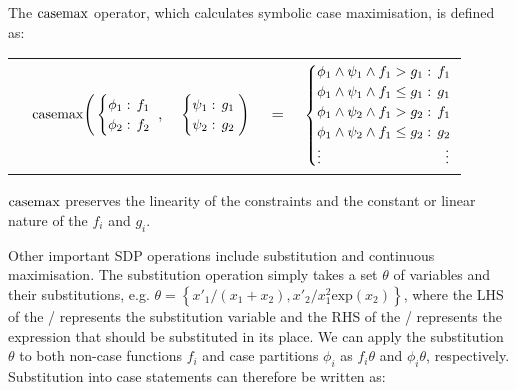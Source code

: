 The $\mathrm{casemax}$ operator, which calculates symbolic case maximisation,
is defined as:
{\small 
\abovedisplayskip=0pt
\belowdisplayskip=0pt
\begin{center}
  \begin{tabular}{r c c c l}
  &
  \hspace{-7mm} $\mathrm{casemax} \Bigg(
    \begin{cases}
        \phi_1: \hspace{-1mm} & \hspace{-1mm} f_1 \\ 
        \phi_2: \hspace{-1mm} & \hspace{-1mm} f_2 \\ 
    \end{cases}$
  $,$
  &
  \hspace{-4mm}
    $\begin{cases}
        \psi_1: \hspace{-1mm} & \hspace{-1mm} g_1 \\ 
        \psi_2: \hspace{-1mm} & \hspace{-1mm} g_2 \\ 
    \end{cases} \Bigg)$
  &
  \hspace{-4mm} 
  $ = $
  &
  \hspace{-4mm}
    $\begin{cases}
      \phi_1 \wedge \psi_1 \wedge f_1 > g_1    : & \hspace{-2mm} f_1 \\ 
      \phi_1 \wedge \psi_1 \wedge f_1 \leq g_1 : & \hspace{-2mm} g_1 \\ 
      \phi_1 \wedge \psi_2 \wedge f_1 > g_2    : & \hspace{-2mm} f_1 \\ 
      \phi_1 \wedge \psi_2 \wedge f_1 \leq g_2 : & \hspace{-2mm} g_2 \\ 
      \vdots & \vdots
    \end{cases}$
  \end{tabular}
\end{center}
}%
$\mathrm{casemax}$ preserves the linearity of the constraints and the constant 
or linear nature of the $f_i$ and $g_i$. 

Other important SDP operations include substitution and continuous maximisation. 
The substitution operation simply takes a set $\theta$ of variables and their
substitutions, e.g. $\theta = \left\{ x'_1/(x_1 + x_2), x'_2/x^2_{1} \text{exp}(x_2) \right\}$,
where the LHS of the / represents the substitution variable and the 
RHS of the / represents the expression that should be substituted in its place.
We can apply the substitution $\theta$ to both non-case functions $f_i$
and case partitions $\phi_i$ as $f_i\theta$ and $\phi_i\theta$, respectively.
Substitution into case statements can therefore be written as:

